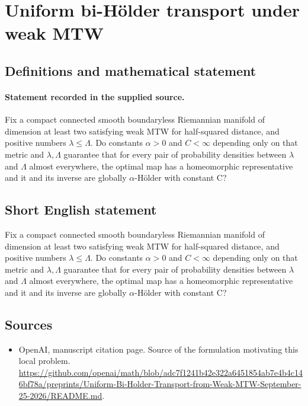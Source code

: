 \documentclass[11pt]{article}
\begin{document}
\section*{Uniform bi-Hölder transport under weak MTW}\label{statement}
\subsection{Definitions and mathematical statement}
\paragraph{Statement recorded in the supplied source.}
Fix a compact connected smooth boundaryless Riemannian manifold of dimension at least two satisfying weak MTW for half-squared distance, and positive numbers $\lambda \leq \Lambda $. Do constants $\alpha >0$ and $C<\infty $ depending only on that metric and $\lambda ,\Lambda $ guarantee that for every pair of probability densities between $\lambda $ and $\Lambda $ almost everywhere, the optimal map has a homeomorphic representative and it and its inverse are globally $\alpha$-Hölder with constant C?
\subsection{Short English statement}
Fix a compact connected smooth boundaryless Riemannian manifold of dimension at least two satisfying weak MTW for half-squared distance, and positive numbers $\lambda \leq \Lambda $. Do constants $\alpha >0$ and $C<\infty $ depending only on that metric and $\lambda ,\Lambda $ guarantee that for every pair of probability densities between $\lambda $ and $\Lambda $ almost everywhere, the optimal map has a homeomorphic representative and it and its inverse are globally $\alpha$-Hölder with constant C?
\subsection{Sources}
\begin{itemize}
\item[S1] OpenAI, manuscript citation page. Source of the formulation motivating this local problem.
\url{https://github.com/openai/math/blob/adc7f1241b42e322a6451854ab7e4b4c146bf78a/preprints/Uniform-Bi-Holder-Transport-from-Weak-MTW-September-25-2026/README.md}.
\end{itemize}
\end{document}
